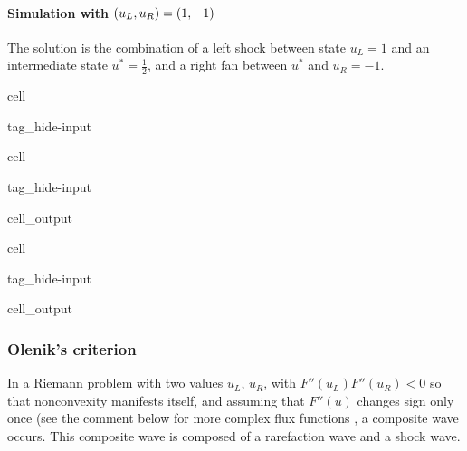 \documentclass[letterpaper,10pt,english]{jupyterBook}
\begin{document}
\paragraph{Simulation with \protect\((u_L, u_R) = (1,-1)\protect\)}
\label{\detokenize{ch/pde/hyperbolic-non-convex:id1}}
\sphinxAtStartPar
The solution is the combination of a left shock between state \(u_L = 1\) and an intermediate state \(u^* = \frac{1}{2}\), and a right fan between \(u^*\) and \(u_R = -1\).

\begin{sphinxuseclass}{cell}
\begin{sphinxuseclass}{tag_hide-input}
\end{sphinxuseclass}
\end{sphinxuseclass}
\begin{sphinxuseclass}{cell}
\begin{sphinxuseclass}{tag_hide-input}\begin{sphinxVerbatimOutput}

\begin{sphinxuseclass}{cell_output}
\noindent{}

\end{sphinxuseclass}\end{sphinxVerbatimOutput}

\end{sphinxuseclass}
\end{sphinxuseclass}
\begin{sphinxuseclass}{cell}
\begin{sphinxuseclass}{tag_hide-input}\begin{sphinxVerbatimOutput}

\begin{sphinxuseclass}{cell_output}
\noindent{}

\end{sphinxuseclass}\end{sphinxVerbatimOutput}

\end{sphinxuseclass}
\end{sphinxuseclass}

\subsubsection{Olenik’s criterion}
\label{\detokenize{ch/pde/hyperbolic-non-convex:olenik-s-criterion}}\label{\detokenize{ch/pde/hyperbolic-non-convex:pdf-hyperbolic-non-convex-toy-problem-olenik}}
\sphinxAtStartPar
In a Riemann problem with two values \(u_L\), \(u_R\), with \(F''(u_L) F''(u_R) < 0\) \sphinxhyphen{} so that non\sphinxhyphen{}convexity manifests itself, and assuming that \(F''(u)\) changes sign only once (see the comment below for more complex flux functions \sphinxhyphen{}, a composite wave occurs. This composite wave is composed of a rarefaction wave and a shock wave.
\end{document}
